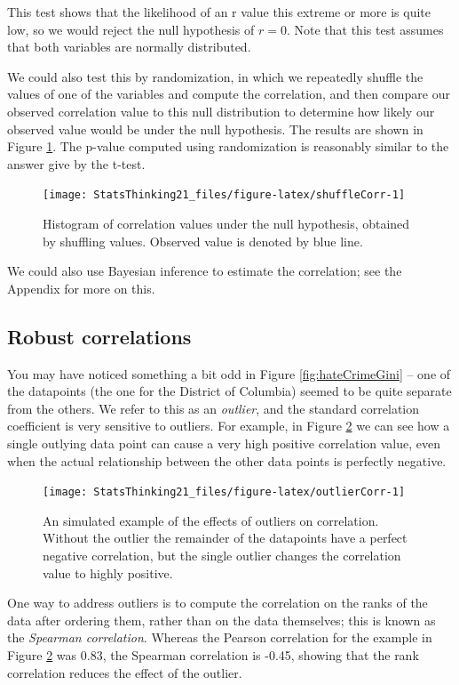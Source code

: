 \documentclass[12pt,]{book}
\theoremstyle{definition}
\theoremstyle{definition}
\theoremstyle{definition}
\theoremstyle{remark}
\begin{document}
This test shows that the likelihood of an r value this extreme or more is quite low, so we would reject the null hypothesis of \(r=0\). Note that this test assumes that both variables are normally distributed.

We could also test this by randomization, in which we repeatedly shuffle the values of one of the variables and compute the correlation, and then compare our observed correlation value to this null distribution to determine how likely our observed value would be under the null hypothesis. The results are shown in Figure \ref{fig:shuffleCorr}. The p-value computed using randomization is reasonably similar to the answer give by the t-test.

\begin{figure}
\texttt{[image: StatsThinking21\_files/figure-latex/shuffleCorr-1]} \caption{Histogram of correlation values under the null hypothesis, obtained by shuffling values. Observed value is denoted by blue line.}\label{fig:shuffleCorr}
\end{figure}

We could also use Bayesian inference to estimate the correlation; see the Appendix for more on this.

\hypertarget{robust-correlations}{%
\subsection{Robust correlations}\label{robust-correlations}}

You may have noticed something a bit odd in Figure \ref{fig:hateCrimeGini} -- one of the datapoints (the one for the District of Columbia) seemed to be quite separate from the others. We refer to this as an \emph{outlier}, and the standard correlation coefficient is very sensitive to outliers. For example, in Figure \ref{fig:outlierCorr} we can see how a single outlying data point can cause a very high positive correlation value, even when the actual relationship between the other data points is perfectly negative.

\begin{figure}
\texttt{[image: StatsThinking21\_files/figure-latex/outlierCorr-1]} \caption{An simulated example of the effects of outliers on correlation.  Without the outlier the remainder of the datapoints have a perfect negative correlation, but the single outlier changes the correlation value to highly positive.}\label{fig:outlierCorr}
\end{figure}

One way to address outliers is to compute the correlation on the ranks of the data after ordering them, rather than on the data themselves; this is known as the \emph{Spearman correlation}. Whereas the Pearson correlation for the example in Figure \ref{fig:outlierCorr} was 0.83, the Spearman correlation is -0.45, showing that the rank correlation reduces the effect of the outlier.
\end{document}
